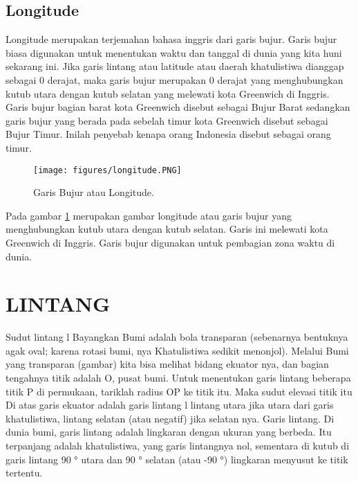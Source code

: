 \subsection{Longitude}
Longitude merupakan terjemahan bahasa inggris dari garis bujur. Garis bujur biasa digunakan untuk menentukan waktu dan tanggal di dunia yang kita huni sekarang ini. Jika garis lintang atau latitude atau daerah khatulistiwa dianggap sebagai 0 derajat, maka garis bujur merupakan 0 derajat yang menghubungkan kutub utara dengan kutub selatan yang melewati kota Greenwich di Inggris. Garis bujur bagian barat kota Greenwich disebut sebagai Bujur Barat sedangkan garis bujur yang berada pada sebelah timur kota Greenwich disebut sebagai Bujur Timur. Inilah penyebab kenapa orang Indonesia disebut sebagai orang timur.
	\begin{figure}[ht]
	\centerline{\texttt{[image: figures/longitude.PNG]}}
	\caption{Garis Bujur atau Longitude.}
	\label{longitude}
	\end{figure}
Pada gambar \ref{longitude} merupakan gambar longitude atau garis bujur yang menghubungkan kutub utara dengan kutub selatan. Garis ini melewati kota Greenwich di Inggris.
Garis bujur digunakan untuk pembagian zona waktu di dunia.

\section{LINTANG}

	Sudut lintang l
	Bayangkan Bumi adalah bola transparan (sebenarnya
	bentuknya agak oval; karena rotasi bumi, nya
	Khatulistiwa sedikit menonjol). Melalui Bumi yang transparan
	(gambar) kita bisa melihat bidang ekuator nya, dan bagian tengahnya
	titik adalah O, pusat bumi.
	Untuk menentukan garis lintang beberapa titik P di permukaan, tariklah
	radius OP ke titik itu. Maka sudut elevasi titik itu
	Di atas garis ekuator adalah garis lintang l lintang utara jika utara
	dari garis khatulistiwa, lintang selatan (atau negatif) jika selatan nya.
	Garis lintang. Di dunia bumi, garis lintang adalah lingkaran dengan ukuran yang berbeda. Itu
	terpanjang adalah khatulistiwa, yang garis lintangnya nol, sementara di kutub di garis lintang
	90 ° utara dan 90 ° selatan (atau -90 °) lingkaran menyusut ke titik tertentu.

